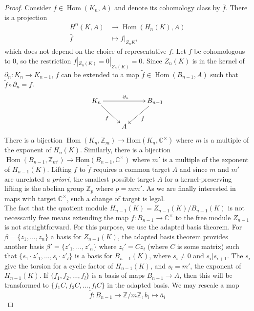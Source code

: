\documentclass[a4paper, 10pt]{book}
\theoremstyle{definition}
\numberwithin{equation}{chapter}
\newcommand\Hom{\operatorname{Hom}}
\newcommand\CC{\mathbb C}
\newcommand\ZZ{\mathbb Z}
\newcommand\kk{\mathbb C}
\newcommand{\ra}\rightarrow
\begin{document}
\begin{proof}

 Consider $f\in \Hom(K_n,A)$  and denote its cohomology class by $\bar{f}$. There is a projection \begin{align}
 	H^n(K,A) &\rightarrow \Hom(H_n(K), A)\\ \bar{f}&\mapsto f|_{Z_nK},
 \end{align} which does not depend on the choice of representative $f$. Let $f$ be cohomologous to 0, so the restriction $f|_{Z_n(K)}=0|_{Z_n(K)}=0$. Since $Z_n(K)$ is in the kernel of $\partial_n:K_n\rightarrow K_{n-1}$, $f$ can be extended to a map $\tilde{f}\in \Hom(B_{n-1}, A)$ such that $\tilde{f}\circ \partial_n =f$. 
\[
\begin{xymatrix}
{ K_n \ar[rd]_f \ar[rr]^{\partial_n} & & B_{n-1}\ar[ld]^{\tilde{f}} \\
& A }
\end{xymatrix}
\]
There is a bijection $\Hom(K_n, \ZZ_m)\ra \text{Hom}(K_n, \CC^\times)$ where $m$ is a multiple of the exponent of $H_n(K)$. Similarly, there is a bijection $\Hom(B_{n-1}, \ZZ_{m'})\ra \text{Hom}(B_{n-1}, \CC^\times)$ where $m'$ is a multiple of the exponent of $H_{n-1}(K)$. Lifting $f$ to $\tilde{f}$ requires a common target $A$ and since  $m$ and $m'$ are unrelated \textit{a priori}, the smallest possible target $A$ for a kernel-preserving lifting is the abelian group $\ZZ_p$ where $p=mm'$. As we are finally interested in maps with target $\kk^\times$, such a change of target is legal.\\
The fact that the quotient module $H_{n-1}(K) = Z_{n-1}(K)/B_{n-1}(K)$ is not necessarily free means extending the map $f:B_{n-1}\ra \CC^\times$ to the free module $Z_{n-1}$ is not straightforward. For this purpose, we use the adapted basis theorem. For $\beta=\{z_1,..., z_n\}$ a basis for $Z_{n-1}(K)$, the adapted basis theorem provides another basis $\beta' =\{z'_1,...,z'_n\}$ where $z_i' = Cz_i$ (where $C$ is some matrix) such that $\{s_1\cdot z'_1,..., s_l\cdot z'_l\}$ is a basis for $B_{n-1}(K)$, where $s_i\neq 0$ and $s_i|s_{i+1}$. The $s_i$ give the torsion for a cyclic factor of $H_{n-1}(K)$, and $s_l=m'$, the exponent of $H_{n-1}(K)$. If $\{f_1, f_2,\dots, f_l\}$ is a basis of maps $B_{n-1}\rightarrow A$, then this will be transformed to $ \{ f_1C, f_2C, \dots, f_lC\}$ in the adapted basis. We may rescale a map \begin{equation}
	 	\tilde{f}: B_{n-1} \rightarrow \ZZ/m\ZZ, b_i\mapsto  \bar{a}_i 	
 \end{equation}

\end{proof}
\end{document}
